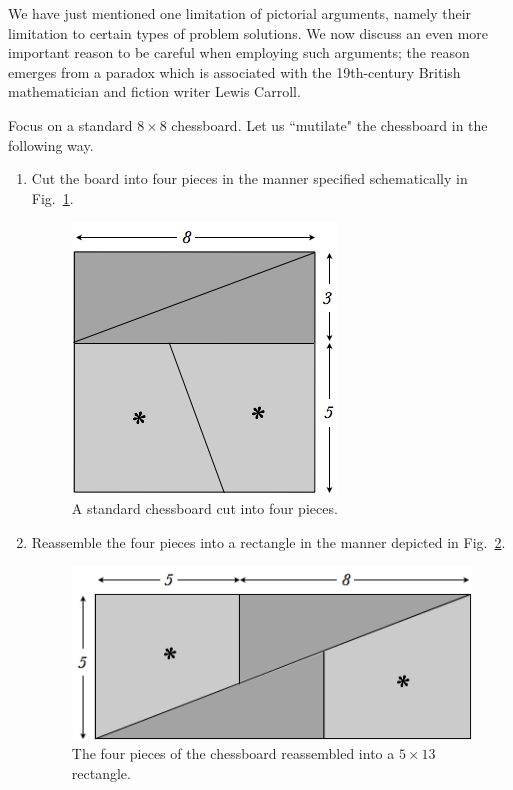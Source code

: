 We have just mentioned one limitation of pictorial arguments, namely their limitation to certain types of problem solutions.  We now discuss an even more important reason to be careful when employing such arguments; the reason emerges from a paradox which is associated with the 19th-century British mathematician and fiction writer Lewis Carroll.

\medskip

Focus on a standard $8 \times 8$ chessboard.  Let us ``mutilate" the chessboard in the following way.
\begin{enumerate}
\item
Cut the board into four pieces in the manner specified schematically in Fig.~\ref{fig:LewisCarollParadox1}.
\begin{figure}[ht]
\begin{center}
       \includegraphics[scale=0.475]{FiguresMaths/LewisCarollParadox1}
\caption{A standard chessboard cut into four pieces.}
       \label{fig:LewisCarollParadox1}
\end{center}
\end{figure}
\item
Reassemble the four pieces into a rectangle in the manner depicted in Fig.~\ref{fig:LewisCarollParadox2}. 
\begin{figure}[ht]
\begin{center}
       \includegraphics[scale=0.475]{FiguresMaths/LewisCarollParadox2}
\caption{The four pieces of the chessboard reassembled into a $5 \times13$ rectangle.}
       \label{fig:LewisCarollParadox2}
\end{center}
\end{figure}
\end{enumerate}

